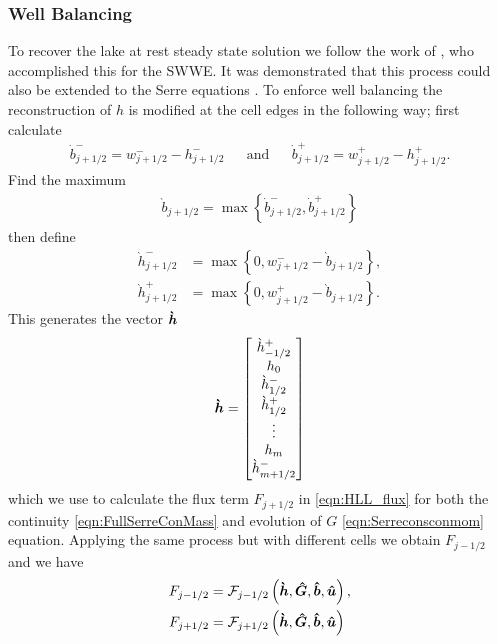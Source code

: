 \subsubsection{Well Balancing}
To recover the lake at rest steady state solution we follow the work of \citet{Klein-etal-2004-2050}, who accomplished this for the SWWE. It was demonstrated that this process could also be extended to the Serre equations \cite{Pitt-J-2014}. To enforce well balancing the reconstruction of $h$ is modified at the cell edges in the following way; first calculate
\begin{align}
\dot{b}^-_{j+1/2} = w^-_{j+1/2} - h^-_{j+1/2} & &\text{and}& &\dot{b}^+_{j+1/2} = w^+_{j+1/2} - h^+_{j+1/2}.
\label{eqn:BedReDefWmH}
\end{align}
Find the maximum
\begin{align*}
\grave{b}_{j+1/2} = \max\left\lbrace\dot{b}^-_{j+1/2} , \dot{b}^+_{j+1/2} \right\rbrace
\end{align*}
then define
\begin{subequations}
\begin{align}
\grave{h}^-_{j+1/2} &= \max\left\lbrace 0, w^-_{j+1/2} - \grave{b}_{j+1/2}  \right\rbrace, \\  \grave{h}^+_{j+1/2} &= \max\left\lbrace 0, w^+_{j+1/2} - \grave{b}_{j+1/2} \right\rbrace.
\end{align}
\label{eqn:ModifiedHValue}
\end{subequations}
This generates the vector $\boldsymbol{\grave{h}}$
\begin{equation*}
\boldsymbol{\grave{h}}= \begin{bmatrix}
\grave{h}^+_{-1/2} \\ h_0 \\ \grave{h}^-_{1/2}  \\ \grave{h}^+_{1/2}  \\ \vdots  \\ h_m  \\ \grave{h}^-_{m + 1/2} \end{bmatrix}
\end{equation*}
which we use to calculate the flux term $F_{j+1/2}$ in \eqref{eqn:HLL_flux} for both the continuity \eqref{eqn:FullSerreConMass} and evolution of $G$ \eqref{eqn:Serreconsconmom} equation. Applying the same process but with different cells we obtain $F_{j-1/2}$ and we have
\begin{subequations}
\begin{align}	
F_{j-1/2} &=\mathcal{F}_{j-1/2} \left(\boldsymbol{\grave{h}}, \boldsymbol{\hat{G}},\boldsymbol{\hat{b}}, \boldsymbol{\hat{u}}  \right),\\
F_{j+1/2} &=\mathcal{F}_{j+1/2} \left(\boldsymbol{\grave{h}}, \boldsymbol{\hat{G}},\boldsymbol{\hat{b}}, \boldsymbol{\hat{u}}  \right)
\label{eqn:FluxFEVM}
\end{align}
\end{subequations}


